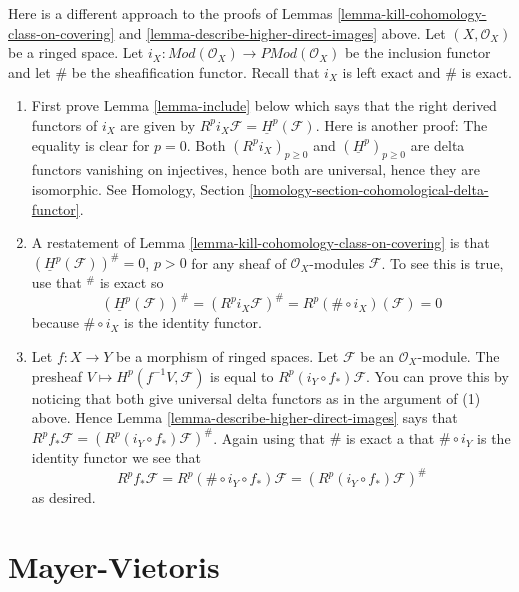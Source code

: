 \begin{remark}
\label{remark-daniel}
Here is a different approach to the proofs of
Lemmas \ref{lemma-kill-cohomology-class-on-covering} and
\ref{lemma-describe-higher-direct-images} above.
Let $(X, \mathcal{O}_X)$ be a ringed space.
Let $i_X : \textit{Mod}(\mathcal{O}_X) \to \textit{PMod}(\mathcal{O}_X)$
be the inclusion functor and let $\#$ be the sheafification functor.
Recall that $i_X$ is left exact and $\#$ is exact.
\begin{enumerate}
\item First prove Lemma \ref{lemma-include} below which says that the
right derived functors of $i_X$ are given by
$R^pi_X\mathcal{F} = \underline{H}^p(\mathcal{F})$.
Here is another proof: The equality is clear for $p = 0$.
Both $(R^pi_X)_{p \geq 0}$ and $(\underline{H}^p)_{p \geq 0}$
are delta functors vanishing on injectives, hence both are universal,
hence they are isomorphic. See Homology,
Section \ref{homology-section-cohomological-delta-functor}.
\item A restatement of Lemma \ref{lemma-kill-cohomology-class-on-covering}
is that $(\underline{H}^p(\mathcal{F}))^\# = 0$, $p > 0$ for any sheaf of
$\mathcal{O}_X$-modules $\mathcal{F}$.
To see this is true, use that ${}^\#$ is exact so
$$
(\underline{H}^p(\mathcal{F}))^\# =
(R^pi_X\mathcal{F})^\# =
R^p(\# \circ i_X)(\mathcal{F}) = 0
$$
because $\# \circ i_X$ is the identity functor.
\item Let $f : X \to Y$ be a morphism of ringed spaces.
Let $\mathcal{F}$ be an $\mathcal{O}_X$-module. The presheaf
$V \mapsto H^p(f^{-1}V, \mathcal{F})$ is equal to
$R^p (i_Y \circ f_*)\mathcal{F}$. You can prove this by noticing that
both give universal delta functors as in the argument of (1) above.
Hence Lemma \ref{lemma-describe-higher-direct-images}
says that $R^p f_* \mathcal{F}= (R^p (i_Y \circ f_*)\mathcal{F})^\#$.
Again using that $\#$ is exact a that $\# \circ i_Y$ is the identity
functor we see that
$$
R^p f_* \mathcal{F} =
R^p(\# \circ i_Y \circ f_*)\mathcal{F} =
(R^p (i_Y \circ f_*)\mathcal{F})^\#
$$
as desired.
\end{enumerate}
\end{remark}






\section{Mayer-Vietoris}
\label{section-mayer-vietoris}

